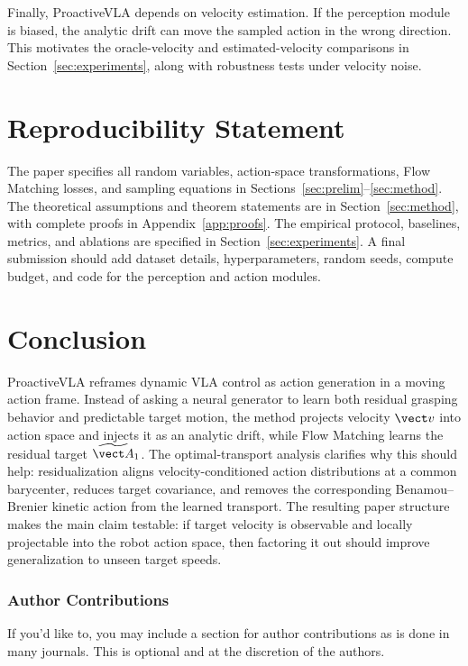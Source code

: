 \documentclass{article} %
\begin{document}
Finally, ProactiveVLA depends on velocity estimation. If the perception module is biased, the analytic drift can move the sampled action in the wrong direction. This motivates the oracle-velocity and estimated-velocity comparisons in Section~\ref{sec:experiments}, along with robustness tests under velocity noise.

\section{Reproducibility Statement}
\label{sec:reproducibility}

The paper specifies all random variables, action-space transformations, Flow Matching losses, and sampling equations in Sections~\ref{sec:prelim}--\ref{sec:method}. The theoretical assumptions and theorem statements are in Section~\ref{sec:method}, with complete proofs in Appendix~\ref{app:proofs}. The empirical protocol, baselines, metrics, and ablations are specified in Section~\ref{sec:experiments}. A final submission should add dataset details, hyperparameters, random seeds, compute budget, and code for the perception and action modules.

\section{Conclusion}
\label{sec:conclusion}

ProactiveVLA reframes dynamic VLA control as action generation in a moving action frame. Instead of asking a neural generator to learn both residual grasping behavior and predictable target motion, the method projects velocity $\vect v$ into action space and injects it as an analytic drift, while Flow Matching learns the residual target $\widetilde{\vect A}_1$. The optimal-transport analysis clarifies why this should help: residualization aligns velocity-conditioned action distributions at a common barycenter, reduces target covariance, and removes the corresponding Benamou--Brenier kinetic action from the learned transport. The resulting paper structure makes the main claim testable: if target velocity is observable and locally projectable into the robot action space, then factoring it out should improve generalization to unseen target speeds.

\subsubsection*{Author Contributions}
If you'd like to, you may include  a section for author contributions as is done
in many journals. This is optional and at the discretion of the authors.
\end{document}

